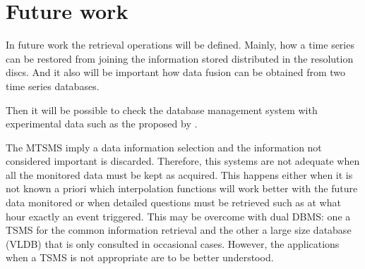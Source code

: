 \section{Future work}\label{sec:future}

In future work the retrieval operations will be defined. Mainly, how a
time series can be restored from joining the information stored
distributed in the resolution discs. And it also will be important
how data fusion can be obtained from two time series databases.

Then it will be possible to check the database management system with
experimental data such as the proposed by \cite{keogh02}.

The MTSMS imply a data information selection and the information not considered important is discarded.  Therefore, this systems are not adequate when all the monitored data must be kept as acquired. This happens either when it is not known a priori which interpolation functions will work better with the future data monitored or when detailed questions must be retrieved such as at what hour exactly an event triggered. This may be overcome with dual DBMS: one a TSMS for the common information retrieval and the other a large size database (VLDB) that is only consulted in occasional cases. 
However, the applications when a TSMS is not appropriate are to be better understood. 

          


